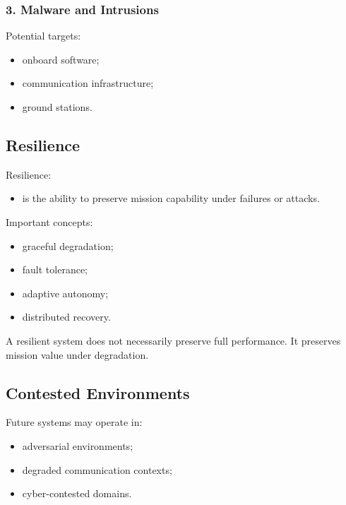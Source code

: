 \documentclass[10pt,a4paper,twocolumn]{article}
\begin{document}

\subsubsection*{3. Malware and Intrusions}

Potential targets:
\begin{itemize}
    \item onboard software;
    \item communication infrastructure;
    \item ground stations.
\end{itemize}


\subsection{Resilience}

Resilience:
\begin{itemize}
    \item is the ability to preserve mission capability under failures or attacks.
\end{itemize}

Important concepts:
\begin{itemize}
    \item graceful degradation;
    \item fault tolerance;
    \item adaptive autonomy;
    \item distributed recovery.
\end{itemize}

\begin{keybox}
    A resilient system does not necessarily preserve full performance. It preserves mission value under degradation.
\end{keybox}


\subsection{Contested Environments}

Future systems may operate in:
\begin{itemize}
    \item adversarial environments;
    \item degraded communication contexts;
    \item cyber-contested domains.
\end{itemize}
\end{document}
